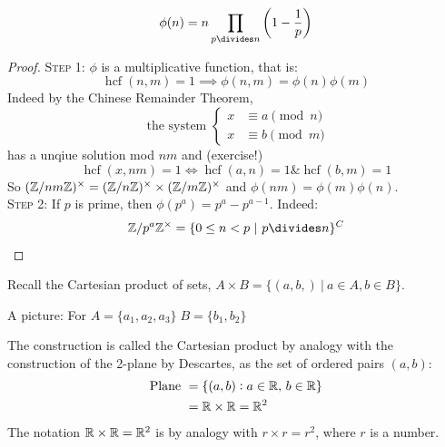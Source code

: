 \documentclass[10pt]{scrartcl}
\DeclareMathOperator{\hcf}{hcf}
\begin{document}
\begin{proposition}
\[\phi(n) = n\prod_{p \divides n} \left(1-\frac{1}{p}\right)\]	
\end{proposition}
\begin{proof}

\textsc{Step 1:} $\phi$ is a multiplicative function, that is: 
	\[\hcf(n,m) = 1 \implies \phi(n,m) = \phi(n)\phi(m)\]
	Indeed by the Chinese Remainder Theorem, 
	\[\text{ the system } \begin{cases}
 	x&\equiv a \pmod{n}\\
 	x&\equiv b \pmod{m}
 \end{cases}
\]
has a unqiue solution mod $nm$ and (exercise!) \[\hcf(x,nm) = 1\iff \hcf(a,n) = 1 \& \hcf(b,m)=1\]
So $(\mathbb{Z} / nm\mathbb{Z})^{\times} = (\mathbb{Z}/n\mathbb{Z})^\times \times (\mathbb{Z} / m\mathbb{Z})^\times$ and $\phi(nm) = \phi(m)\phi(n)$.\\

\textsc{Step 2:} If $p$ is prime, then $\phi(p^a) = p^a - p^{a-1}$. Indeed: \[\Z / p^a\Z ^\times = \{0 \leq n < p ~|~ p \divides n\}^C\]
\end{proof}






Recall the Cartesian product of sets, $A \times B = \{(a,b,) ~|~ a \in A, b \in B\}$. 

A picture: For $A = \{a_1,a_2,a_3\}\; B = \{b_1,b_2\}$

\begin{center}
	
\end{center}
The construction is called the Cartesian product by analogy with the construction of the 2-plane by Descartes, as the set of ordered pairs $(a,b)$:
\[
\begin{aligned}
  \text{Plane } &= \{(a,b) : a \in\mathbb{R},\, b\in\mathbb{R}\}\\
  &= \mathbb{R} \times \mathbb{R} = \mathbb{R}^2
\end{aligned}
\]
The notation $\mathbb{R} \times \mathbb{R} = \mathbb{R}^2$ is by analogy with $r \times r = r^2$, where $r$ is a number.\\
\end{document}
